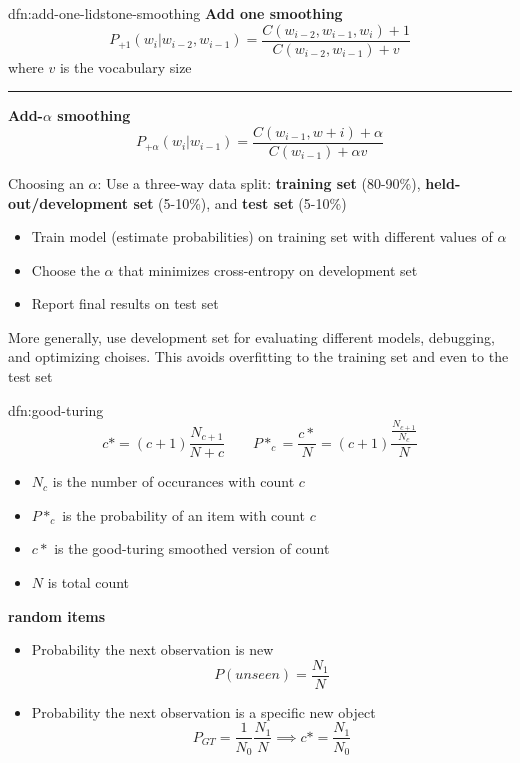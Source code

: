 \documentclass[landscape, 8pt]{extarticle}
\begin{document}
\begin{multicols}{3}
\begin{dfn}{dfn:add-one-lidstone-smoothing}{}
    \textbf{Add one smoothing}
    \[P_{+1}(w_{i} | w_{i-2}, w_{i-1}) = \frac{C(w_{i-2}, w_{i-1}, w_{i}) + 1}{C(w_{i - 2}, w_{i-1}) + v}\]
    where $v$ is the vocabulary size

    \noindent\rule{\textwidth}{0.2pt}

    \textbf{Add-$\alpha$ smoothing}
    \[P_{+\alpha}(w_{i} | w_{i - 1}) = \frac{C(w_{i-1}, w+i) + \alpha}{C(w_{i-1}) + \alpha v}\]

    Choosing an $\alpha$: Use a three-way data split: \textbf{training set} (80-90\%), \textbf{held-out/development set} (5-10\%), and \textbf{test set} (5-10\%)
    \begin{itemize}
        \setlength\itemsep{0em}
        \item Train model (estimate probabilities) on training set with different values of $\alpha$
        \item Choose the $\alpha$ that minimizes cross-entropy on development set
        \item Report final results on test set
    \end{itemize}
    More generally, use development set for evaluating different models, debugging, and optimizing choises. This avoids overfitting to the training set and even to the test set

\end{dfn}

\begin{dfn}{dfn:good-turing}{}
    \[c* = (c + 1) \frac{N_{c+1}}{N+c} \qquad P*_{c} = \frac{c*}{N} = (c + 1) \frac{\frac{N_{c+1}}{N_{c}}}{N}\]

    \begin{itemize}[leftmargin=*]
        \setlength\itemsep{0em}
        \item $N_{c}$ is the number of occurances with count $c$
        \item $P*_{c}$ is the probability of an item with count $c$
        \item $c*$ is the good-turing smoothed version of count
        \item $N$ is total count
    \end{itemize}

    \textbf{random items}
    \begin{itemize}
        \setlength\itemsep{0em}
        \item Probability the next observation is new
            \[P(unseen) = \frac{N_{1}}{N}\]
        \item Probability the next observation is a specific new object
            \[P_{GT} = \frac{1}{N_{0}} \frac{N_{1}}{N} \implies c* = \frac{N_{1}}{N_{0}}\]
    \end{itemize}


\end{dfn}
\end{multicols}
\end{document}
